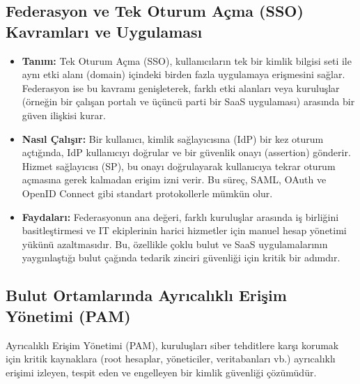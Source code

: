\subsection{Federasyon ve Tek Oturum Açma (SSO) Kavramları ve Uygulaması}
\begin{itemize}
    \item \textbf{Tanım:} Tek Oturum Açma (SSO), kullanıcıların tek bir kimlik bilgisi seti ile aynı etki alanı (domain) içindeki birden fazla uygulamaya erişmesini sağlar. Federasyon ise bu kavramı genişleterek, farklı etki alanları veya kuruluşlar (örneğin bir çalışan portalı ve üçüncü parti bir SaaS uygulaması) arasında bir güven ilişkisi kurar.
    \item \textbf{Nasıl Çalışır:} Bir kullanıcı, kimlik sağlayıcısına (IdP) bir kez oturum açtığında, IdP kullanıcıyı doğrular ve bir güvenlik onayı (assertion) gönderir. Hizmet sağlayıcısı (SP), bu onayı doğrulayarak kullanıcıya tekrar oturum açmasına gerek kalmadan erişim izni verir. Bu süreç, SAML, OAuth ve OpenID Connect gibi standart protokollerle mümkün olur.
    \item \textbf{Faydaları:} Federasyonun ana değeri, farklı kuruluşlar arasında iş birliğini basitleştirmesi ve IT ekiplerinin harici hizmetler için manuel hesap yönetimi yükünü azaltmasıdır. Bu, özellikle çoklu bulut ve SaaS uygulamalarının yaygınlaştığı bulut çağında tedarik zinciri güvenliği için kritik bir adımdır.
\end{itemize}

\subsection{Bulut Ortamlarında Ayrıcalıklı Erişim Yönetimi (PAM)}
Ayrıcalıklı Erişim Yönetimi (PAM), kuruluşları siber tehditlere karşı korumak için kritik kaynaklara (root hesaplar, yöneticiler, veritabanları vb.) ayrıcalıklı erişimi izleyen, tespit eden ve engelleyen bir kimlik güvenliği çözümüdür.

